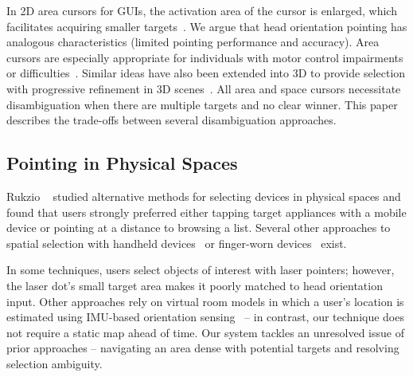 In 2D area cursors for GUIs, the activation area of the cursor is enlarged, which facilitates acquiring smaller targets~\cite{kabbash1995prince}. We argue that head orientation pointing has analogous characteristics (limited pointing performance and accuracy). Area cursors are especially appropriate for individuals with motor control impairments or difficulties~\cite{worden1997making,findlater2010enhanced}. Similar ideas have also been extended into 3D to provide selection with progressive refinement in 3D scenes~\cite{bacim2013design}. All area and space cursors necessitate disambiguation when there are multiple targets and no clear winner. This paper describes the trade-offs between several disambiguation approaches.



\subsection{Pointing in Physical Spaces}
Rukzio  ~\cite{rukzio_experimental_2006} studied alternative
methods for selecting devices in physical spaces and found that users strongly
preferred either tapping target appliances with a mobile device or pointing at a
distance to browsing a list. Several other approaches to spatial selection with
handheld
devices~\cite{beigl_point_1999,patel_2-way_2003,wilson_xwand:_2003,schmidt_picontrol:_2012,kemp_point-and-click_2008}
or finger-worn devices~\cite{merrill_augmenting_2007} exist.

In some techniques, users select objects of interest with laser pointers;
however, the laser dot's small target area makes it poorly matched to head
orientation input.  Other approaches rely on virtual room models in which a
user's location is estimated using IMU-based orientation
sensing~\cite{wilson_xwand:_2003,lifton_tricorder:_2007} -- in contrast, our
technique does not require a static map ahead of time. 
Our system tackles an unresolved issue of prior approaches -- navigating an area
dense with potential targets and resolving selection ambiguity.

